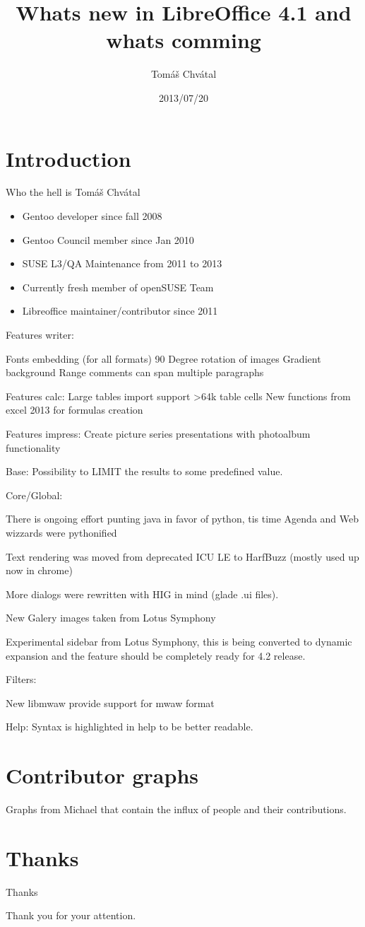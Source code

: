 \documentclass{beamer}
\author{Tom\'{a}\v{s} Chv\'{a}tal\newline {\small openSUSE Team}}
\title{Whats new in LibreOffice 4.1 and whats comming}
\date{2013/07/20}
\begin{document}
\begin{frame}[t,plain]
\titlepage
\end{frame}

\section{Introduction}

\begin{frame}{Who the hell is Tomáš Chvátal}
	\begin{itemize}
	\item Gentoo developer since fall 2008
	\item Gentoo Council member since Jan 2010
	\item SUSE L3/QA Maintenance from 2011 to 2013
	\item Currently fresh member of openSUSE Team
	\item Libreoffice maintainer/contributor since 2011
	\end{itemize}
\end{frame}

Features writer:

Fonts embedding (for all formats)
90 Degree rotation of images
Gradient background
Range comments can span multiple paragraphs

Features calc:
Large tables import support >64k table cells
New functions from excel 2013 for formulas creation

Features impress:
Create picture series presentations with photoalbum functionality

Base:
Possibility to LIMIT the results to some predefined value.

Core/Global:

There is ongoing effort punting java in favor of python, tis time Agenda and Web wizzards were pythonified

Text rendering was moved from deprecated ICU LE to HarfBuzz (mostly used up now in chrome)

More dialogs were rewritten with HIG in mind (glade .ui files).

New Galery images taken from Lotus Symphony

Experimental sidebar from Lotus Symphony, this is being converted to dynamic expansion and the feature should be completely ready for 4.2 release.

Filters:

New libmwaw provide support for mwaw format

Help:
Syntax is highlighted in help to be better readable.

\section{Contributor graphs}

Graphs from Michael that contain the influx of people and their contributions.

\section{Thanks}

\begin{frame}{Thanks}
	\begin{center}
	Thank you for your attention.
	\end{center}
\end{frame}
\end{document}
